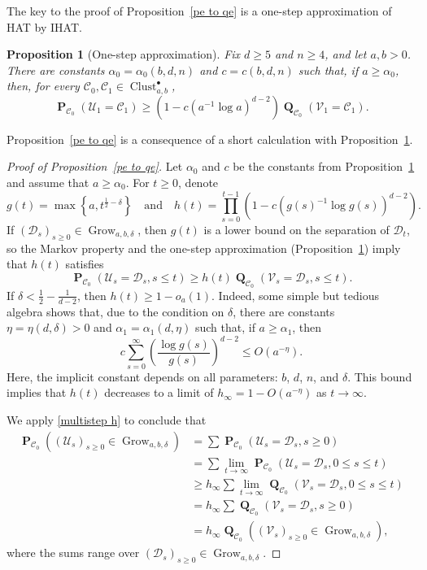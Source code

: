\documentclass[11pt,reqno]{amsart}
\newtheorem{proposition}[lemma]{Proposition}
\theoremstyle{definition}
\numberwithin{equation}{section}
\newcommand{\1}{\mathbf{1}}
\DeclareMathOperator{\PP}{\mathbf{P}}
\DeclareMathOperator{\QQ}{\mathbf{Q}}
\newcommand{\CC}{\mathcal{C}}
\newcommand{\UU}{\mathcal{U}}
\newcommand{\VV}{\mathcal{V}}
\newcommand{\DD}{\mathcal{D}}
\DeclareMathOperator{\Clust}{\mathrm{Clust}}
\DeclareMathOperator{\Grow}{\mathrm{Grow}}
\begin{document}
The key to the proof of Proposition~\ref{pe to qe} is a one-step approximation of HAT by IHAT.

\begin{proposition}[One-step approximation]\label{p to q}
Fix $d \geq 5$ and $n \geq 4$, and let $a,b > 0$. There are constants $\alpha_0 = \alpha_0 (b,d,n)$ and $c = c(b,d,n)$ such that, if $a \geq \alpha_0$, then, for every $\CC_0, \CC_1 \in \Clust_{a,b}^\bullet$,
\begin{equation}\label{eq p to q}
\PP_{\CC_0} (\UU_1 = \CC_1) \geq \left( 1 - c \left(a^{-1} \log a\right)^{d-2} \right) \QQ_{\CC_0} (\VV_1 = \CC_1).
\end{equation}
\end{proposition}




Proposition~\ref{pe to qe} is a consequence of a short calculation with Proposition~\ref{p to q}.

\begin{proof}[Proof of Proposition~\ref{pe to qe}]
Let $\alpha_0$ and $c$ be the constants from Proposition~\ref{p to q} and assume that $a \geq \alpha_0$. For $t \geq 0$, denote 
\[
g(t) = \max\left\{a, t^{\frac12 - \delta}\right\} \quad \text{and} \quad h (t) = \prod_{s=0}^{t-1} \left(1 - c \left( g(s)^{-1} \log g(s) \right)^{d-2} \right).
\]
If $(\DD_s)_{s \geq 0} \in \Grow_{a,b,\delta}$, then $g(t)$ is a lower bound on the separation of $\DD_t$, so the Markov property and the one-step approximation (Proposition~\ref{p to q}) imply that $h(t)$ satisfies
\begin{equation}\label{multistep h}
\PP_{\CC_0} \left( \UU_s = \DD_s, s \leq t \right) \geq h(t) \QQ_{\CC_0} \left( \VV_s = \DD_s, s \leq t \right).
\end{equation}
If $\delta < \frac12 - \frac{1}{d-2}$, then $h(t) \geq 1 - o_a (1)$. Indeed, some simple but tedious algebra shows that, due to the condition on $\delta$, there are constants $\eta = \eta (d,\delta) > 0$ and $\alpha_1 = \alpha_1 (d, \eta)$ such that, if $a \geq \alpha_1$, then
\[
c\sum_{s = 0}^\infty \left( \frac{\log g(s)}{g(s)} \right)^{d-2} \leq O \left(a^{-\eta}\right).
\]
Here, the implicit constant depends on all parameters: $b$, $d$, $n$, and $\delta$. This bound implies that $h(t)$ decreases to a limit of $h_\infty = 1 - O (a^{-\eta})$ as $t \to \infty$.  

We apply \eqref{multistep h} to conclude that
\begin{align*}
\PP_{\CC_0} \left( (\UU_s)_{s \geq 0} \in \Grow_{a,b,\delta} \right)
&= \sum \PP_{\CC_0} \left( \UU_s = \DD_s, s \geq 0 \right)\\ 
&= \sum \lim_{t \to \infty} \PP_{\CC_0} \left( \UU_s = \DD_s, 0 \leq s \leq t\right)\\ 
&\geq h_\infty \sum \lim_{t \to \infty} \QQ_{\CC_0} \left( \VV_s = \DD_s, 0 \leq s \leq t\right)\\ 
&= h_\infty \sum \QQ_{\CC_0} \left( \VV_s = \DD_s, s \geq 0\right)\\ 
&= h_\infty \QQ_{\CC_0} \left( (\VV_s)_{s \geq 0} \in \Grow_{a,b,\delta} \right), 
\end{align*}
where the sums range over $(\DD_s)_{s \geq 0} \in \Grow_{a,b,\delta}$. 
\end{proof}
\end{document}
